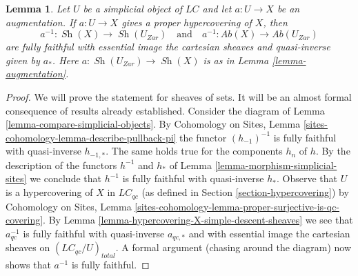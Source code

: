 \documentclass{stacks-project}
\theoremstyle{plain}
\newtheorem{lemma}[subsection]{Lemma}
\theoremstyle{definition}
\theoremstyle{remark}
\numberwithin{equation}{subsection}
\def\Sh{\mathop{\mathit{Sh}}\nolimits}
\begin{document}
\begin{lemma}
\label{lemma-descent-sheaves-for-proper-hypercovering}
Let $U$ be a simplicial object of $\textit{LC}$ and let $a : U \to X$
be an augmentation. If $a : U \to X$ gives a proper hypercovering of $X$,
then
$$
a^{-1} : \Sh(X) \to \Sh(U_{Zar})
\quad\text{and}\quad
a^{-1} : \textit{Ab}(X) \to \textit{Ab}(U_{Zar})
$$
are fully faithful with essential image the cartesian sheaves and
quasi-inverse given by $a_*$. Here $a : \Sh(U_{Zar}) \to \Sh(X)$ is as in
Lemma \ref{lemma-augmentation}.
\end{lemma}

\begin{proof}
We will prove the statement for sheaves of sets. It will be an
almost formal consequence of results already established.
Consider the diagram of Lemma \ref{lemma-compare-simplicial-objects}.
By Cohomology on Sites, Lemma \ref{sites-cohomology-lemma-describe-pullback-pi}
the functor $(h_{-1})^{-1}$ is fully faithful with quasi-inverse $h_{-1, *}$.
The same holds true for the components $h_n$ of $h$.
By the description of the functors $h^{-1}$ and $h_*$ of
Lemma \ref{lemma-morphism-simplicial-sites}
we conclude that $h^{-1}$ is fully faithful with quasi-inverse $h_*$.
Observe that $U$ is a hypercovering of $X$ in $\textit{LC}_{qc}$
(as defined in Section \ref{section-hypercovering}) by
Cohomology on Sites, Lemma
\ref{sites-cohomology-lemma-proper-surjective-is-qc-covering}.
By Lemma \ref{lemma-hypercovering-X-simple-descent-sheaves}
we see that $a_{qc}^{-1}$ is fully faithful with quasi-inverse $a_{qc, *}$
and with essential image the cartesian sheaves on
$(\textit{LC}_{qc}/U)_{total}$.
A formal argument (chasing around the diagram) now shows that
$a^{-1}$ is fully faithful.


\end{proof}
\end{document}
